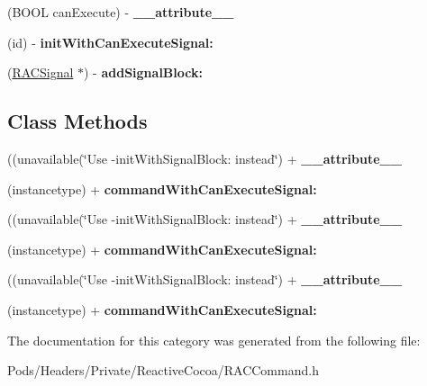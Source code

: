 \begin{DoxyCompactItemize}
(B\+O\+OL can\+Execute) -\/ {\bfseries \+\_\+\+\_\+attribute\+\_\+\+\_\+}
\item 
\mbox{\label{category_r_a_c_command_07_unavailable_08_ad8e41d37764bb5f4c46c48d90914765e}} 
(id) -\/ {\bfseries init\+With\+Can\+Execute\+Signal\+:}
\item 
\mbox{\label{category_r_a_c_command_07_unavailable_08_a1cf11afe113e8e4855c9317856df0be2}} 
(\mbox{\hyperlink{interface_r_a_c_signal}{R\+A\+C\+Signal}} $\ast$) -\/ {\bfseries add\+Signal\+Block\+:}
\end{DoxyCompactItemize}
\subsection*{Class Methods}
\begin{DoxyCompactItemize}
\item 
\mbox{\label{category_r_a_c_command_07_unavailable_08_a191b2d1f4e349debb5366667ecbff084}} 
((unavailable(\char`\"{}Use -\/init\+With\+Signal\+Block\+: instead\char`\"{}) + {\bfseries \+\_\+\+\_\+attribute\+\_\+\+\_\+}
\item 
\mbox{\label{category_r_a_c_command_07_unavailable_08_ac16216cd8194a17a05e139e390a237db}} 
(instancetype) + {\bfseries command\+With\+Can\+Execute\+Signal\+:}
\item 
\mbox{\label{category_r_a_c_command_07_unavailable_08_a191b2d1f4e349debb5366667ecbff084}} 
((unavailable(\char`\"{}Use -\/init\+With\+Signal\+Block\+: instead\char`\"{}) + {\bfseries \+\_\+\+\_\+attribute\+\_\+\+\_\+}
\item 
\mbox{\label{category_r_a_c_command_07_unavailable_08_ac16216cd8194a17a05e139e390a237db}} 
(instancetype) + {\bfseries command\+With\+Can\+Execute\+Signal\+:}
\item 
\mbox{\label{category_r_a_c_command_07_unavailable_08_a191b2d1f4e349debb5366667ecbff084}} 
((unavailable(\char`\"{}Use -\/init\+With\+Signal\+Block\+: instead\char`\"{}) + {\bfseries \+\_\+\+\_\+attribute\+\_\+\+\_\+}
\item 
\mbox{\label{category_r_a_c_command_07_unavailable_08_ac16216cd8194a17a05e139e390a237db}} 
(instancetype) + {\bfseries command\+With\+Can\+Execute\+Signal\+:}
\end{DoxyCompactItemize}


The documentation for this category was generated from the following file\+:\begin{DoxyCompactItemize}
\item 
Pods/\+Headers/\+Private/\+Reactive\+Cocoa/R\+A\+C\+Command.\+h\end{DoxyCompactItemize}
